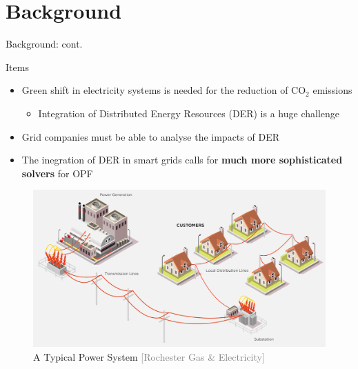 \documentclass{beamer}
\begin{document}
\section{Background}
\begin{frame}{Background: cont.}
\begin{block}{Items}
\begin{itemize}
\item <1-> \small Green shift in electricity systems is needed for the reduction of $\mathrm{CO_2}$ emissions
\begin{itemize}
\item<2-> \tiny  Integration of Distributed Energy Resources (DER) is a huge challenge
\end{itemize}
\item<3->\small Grid companies must be able to analyse the impacts of DER 
\item<5->\small The inegration of DER in smart grids calls for \textbf{much more sophisticated solvers} for OPF
\end{itemize}
\end{block}
\begin{figure}
\includegraphics[scale=0.06]{Figures/PowerSys.png}
 \caption{A Typical Power System \textcolor{gray}{\tiny[Rochester Gas \& Electricity]}}
\end{figure}

\end{frame}
\end{document}
